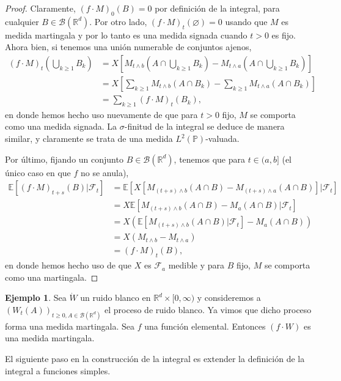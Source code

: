\documentclass[letterpaper,twoside,12pt]{book}
\newcommand{\R}{\mathbb{R}}
\newcommand{\F}{\mathcal{F}}
\newcommand{\B}{\mathcal{B}}
\newcommand{\E}{\mathbb{E}}
\renewcommand{\P}{\mathbb{P}}
\newcommand{\W}{\dot{W}}
\newcommand{\1}{\mathds{1}}
\theoremstyle{definition}
\theoremstyle{definition}
\theoremstyle{remark}
\theoremstyle{definition}
\theoremstyle{definition}
\theoremstyle{definition}
\theoremstyle{definition}
\newtheorem{ejem}{Ejemplo}
\theoremstyle{definition}
\begin{document}
\begin{proof} 
 Claramente, $(f\cdot M)_0(B)=0$ por definición de la integral, para cualquier $B\in \B(\R^{d})$. Por otro lado, $(f\cdot M)_t(\varnothing)=0$ usando que $M$ es medida martingala y por lo tanto es una medida signada cuando $t>0$ es fijo. Ahora bien, si tenemos una unión numerable de conjuntos ajenos, 
\begin{align*}
      (f\cdot M)_t\left(\bigcup_{k\geq1}B_k\right)&=X \left[M_{t\wedge b}\left(A\cap \bigcup_{k\geq1}B_k\right)-M_{t\wedge a}\left(A\cap \bigcup_{k\geq1}B_k\right)\right]\\
      &=X \left[\sum_{k\geq1}M_{t\wedge b}(A\cap B_k)-\sum_{k\geq1}M_{t\wedge a}(A\cap B_k)\right]\\
      &=\sum_{k\geq1}(f\cdot M)_t(B_k),     
   \end{align*}
en donde hemos hecho uso nuevamente de que para $t>0$ fijo, $M$ se comporta como una medida signada. La $\sigma$-finitud de la integral se deduce de manera similar, y claramente se trata de una medida $L^2(\P)$-valuada.

Por último, fijando un conjunto $B\in \B(\R^{d})$, tenemos que para $t\in (a,b]$ (el único caso en que $f$ no se anula),
\begin{align*}
   \E\left[(f\cdot M)_{t+s}(B)|\F_{t}\right]&=\E\left[X\left[M_{(t+s)\wedge b}(A\cap B)-M_{(t+s)\wedge a}(A\cap B)\right]|\F_t\right]\\
   &=X\E\left[M_{(t+s)\wedge b}(A\cap B)-M_ a (A\cap B)|\F_t\right]\\
   &=X\left(\E\left[M_{(t+s)\wedge b}(A\cap B)|\F_t\right]-M_a(A\cap B)\right)\\
   &=X\left(M_{t\wedge b}-M_{t\wedge a}\right)\\
   &=(f\cdot M)_t(B),
\end{align*}
en donde hemos hecho uso de que $X$ es $\F_a$ medible y para $B$ fijo, $M$ se comporta como una martingala.
\end{proof}
\begin{ejem} 
Sea $\W$ un ruido blanco en $\R^{d}\times[0,\infty)$ y consideremos a $(W_t(A))_{t\geq0,A\in \B(\R^d)}$ el proceso de ruido blanco. Ya vimos que dicho proceso forma una medida martingala. Sea $f$ una función elemental. Entonces $(f\cdot W)$ es una medida martingala.
\end{ejem}

El siguiente paso en la construcción de la integral es extender la definición de la integral a funciones simples. 
\end{document}
